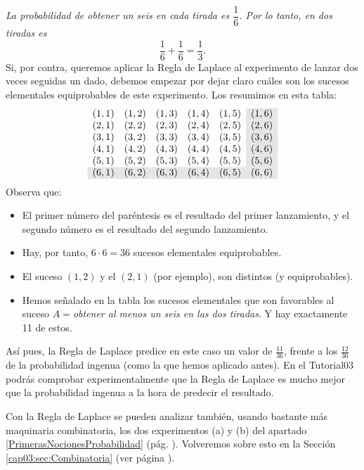 {\sf\em La probabilidad de obtener un seis en cada tirada es $\dfrac{1}{6}$. Por lo tanto, en dos tiradas es %
\[\dfrac{1}{6}+\dfrac{1}{6} = \dfrac{1}{3}.\]}
Si, por contra, queremos aplicar la Regla de Laplace al experimento de lanzar dos veces seguidas un dado, debemos empezar por dejar claro cuáles son los sucesos elementales equiprobables de este experimento. Los resumimos en esta tabla:
    \[
        \rowcolors{6}{lightgrey}{lightgrey}
        \begin{array}{rrrrrr}
        (1,1)&(1,2)&(1,3)&(1,4)&(1,5)&\cellcolor[gray]{0.9}{(1,6)}\\
        (2,1)&(2,2)&(2,3)&(2,4)&(2,5)&\cellcolor[gray]{0.9}{(2,6)}\\
        (3,1)&(3,2)&(3,3)&(3,4)&(3,5)&\cellcolor[gray]{0.9}{(3,6)}\\
        (4,1)&(4,2)&(4,3)&(4,4)&(4,5)&\cellcolor[gray]{0.9}{(4,6)}\\
        (5,1)&(5,2)&(5,3)&(5,4)&(5,5)&\cellcolor[gray]{0.9}{(5,6)}\\
        \cellcolor[gray]{0.9}{(6,1)}&\cellcolor[gray]{0.9}{(6,2)}&\cellcolor[gray]{0.9}{(6,3)}&\cellcolor[gray]{0.9}{(6,4)}&\cellcolor[gray]{0.9}{(6,5)}&\cellcolor[gray]{0.9}{(6,6)}
        \end{array}
    \]
Observa que:
    \begin{itemize}
        \item El primer número del paréntesis es el resultado del primer lanzamiento, y el segundo número es el resultado del segundo lanzamiento.
        \item Hay, por tanto, $6\cdot 6=36$ sucesos elementales equiprobables.
        \item El suceso $(1,2)$ y el $(2,1)$ (por ejemplo), son distintos (y equiprobables).
        \item Hemos señalado en la tabla los sucesos elementales que son favorables al suceso $A=${\em obtener al menos un seis en las dos tiradas}. Y hay exactamente 11 de estos.
    \end{itemize}
Así pues, la Regla de Laplace predice en este caso un valor de $\frac{11}{36}$, frente a los $\frac{12}{36}$ de la probabilidad ingenua (como la que
hemos aplicado antes). En el Tutorial03 podrás comprobar experimentalmente que la Regla de Laplace es mucho mejor que la probabilidad ingenua a la hora de predecir el
resultado.

Con la Regla de Laplace se pueden analizar también, usando bastante más maquinaria combinatoria, los dos experimentos (a) y (b) del apartado \ref{PrimerasNocionesProbabilidad} (pág. \pageref{PrimerasNocionesProbabilidad}). Volveremos sobre esto en la Sección \ref{cap03:sec:Combinatoria} (ver página \pageref{cap03:subsubsec:JuegosDeMereCombinatoria}).

